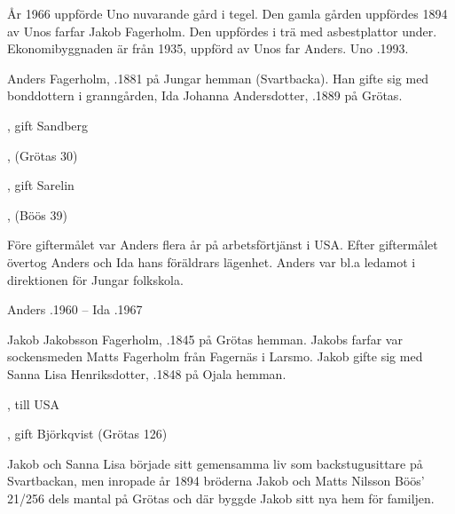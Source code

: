 År 1966 uppförde Uno nuvarande gård i tegel. Den gamla gården uppfördes 1894 av Unos farfar Jakob Fagerholm. Den uppfördes i trä med asbestplattor under. Ekonomibyggnaden är från 1935, uppförd av Unos far Anders.
Uno .1993.


Anders Fagerholm, .1881 på Jungar hemman (Svartbacka). Han gifte sig med bonddottern i granngården, Ida Johanna Andersdotter, .1889 på Grötas.
\begin{jhchildren}
  \item {}, gift Sandberg
  \item {}
  \item {}
  \item {}, (Grötas  30)
  \item {}
  \item {}, gift Sarelin
  \item {}, (Böös 39)
  \item {}
\end{jhchildren}
Före giftermålet var Anders flera år på arbetsförtjänst i USA. Efter giftermålet övertog Anders och Ida hans föräldrars lägenhet. Anders var bl.a ledamot i direktionen för Jungar folkskola.

Anders .1960  -- Ida .1967


Jakob Jakobsson Fagerholm, .1845 på Grötas hemman. Jakobs farfar var sockensmeden Matts Fagerholm från Fagernäs i Larsmo. Jakob gifte sig med Sanna Lisa Henriksdotter, .1848 på Ojala hemman.
\begin{jhchildren}
  \item {}, till USA
  \item {}
  \item {}
  \item {}, gift Björkqvist (Grötas 126)
\end{jhchildren}
Jakob och Sanna Lisa började sitt gemensamma liv som backstugusittare på Svartbackan, men inropade år 1894  bröderna Jakob och Matts Nilsson Böös' 21/256 dels mantal på Grötas och där byggde Jakob sitt nya hem för familjen.

